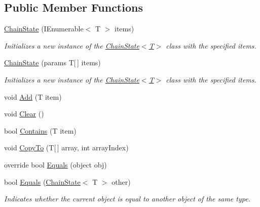 \subsection*{Public Member Functions}
\begin{DoxyCompactItemize}
\item 
\mbox{\hyperlink{class_markov_1_1_chain_state_a350f2699a1eb55d8b041ff394c6ae3d4}{Chain\+State}} (I\+Enumerable$<$ T $>$ items)
\begin{DoxyCompactList}\small\item\em Initializes a new instance of the \mbox{\hyperlink{class_markov_1_1_chain_state_a350f2699a1eb55d8b041ff394c6ae3d4}{Chain\+State$<$\+T$>$}} class with the specified items. \end{DoxyCompactList}\item 
\mbox{\hyperlink{class_markov_1_1_chain_state_a69f3f9f56c55b4e31297d0c894c847a4}{Chain\+State}} (params T\mbox{[}$\,$\mbox{]} items)
\begin{DoxyCompactList}\small\item\em Initializes a new instance of the \mbox{\hyperlink{class_markov_1_1_chain_state_a350f2699a1eb55d8b041ff394c6ae3d4}{Chain\+State$<$\+T$>$}} class with the specified items. \end{DoxyCompactList}\item 
void \mbox{\hyperlink{class_markov_1_1_chain_state_abbc65b63c2626b9c575c18afbfcce28b}{Add}} (T item)
\item 
void \mbox{\hyperlink{class_markov_1_1_chain_state_aed8735821f05d6cde49beeb9e6d8cbe3}{Clear}} ()
\item 
bool \mbox{\hyperlink{class_markov_1_1_chain_state_a648edb3b1f6b26637588cc412a2d665f}{Contains}} (T item)
\item 
void \mbox{\hyperlink{class_markov_1_1_chain_state_a5ed671961c6e7e5fde9810d3b812bbac}{Copy\+To}} (T\mbox{[}$\,$\mbox{]} array, int array\+Index)
\item 
override bool \mbox{\hyperlink{class_markov_1_1_chain_state_a7774a491a81fcf44fd7777f3d58e57e5}{Equals}} (object obj)
\item 
bool \mbox{\hyperlink{class_markov_1_1_chain_state_ae7f0298aa37790cf06f6daf63e879c29}{Equals}} (\mbox{\hyperlink{class_markov_1_1_chain_state}{Chain\+State}}$<$ T $>$ other)
\begin{DoxyCompactList}\small\item\em Indicates whether the current object is equal to another object of the same type. \end{DoxyCompactList}\item 

\end{DoxyCompactItemize}

